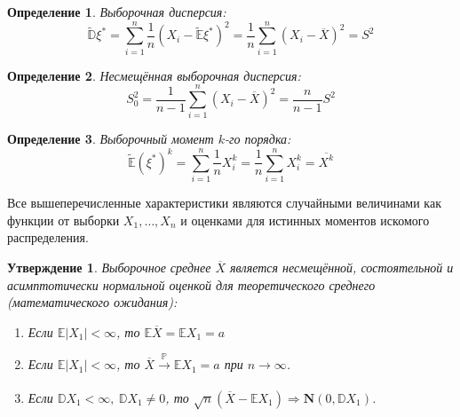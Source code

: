\documentclass[oneside,final,14pt]{extreport}
\theoremstyle{plain}
\newtheorem*{thm*}{Утверждение}
\theoremstyle{definition}
\newtheorem*{defn}{Определение}
\theoremstyle{named}
\begin{document}
\begin{defn}
{\it Выборочная дисперсия:}
\begin{equation*}
    \tilde{\mathbb{D}} \xi^{*}=\sum\limits_{i=1}^{n} \frac{1}{n}(X_{i}-\tilde{\mathbb{E}} \xi^{*})^{2}=\frac{1}{n} \sum\limits_{i=1}^{n}(X_{i}-\overline{X})^{2}=S^{2}
\end{equation*}
\end{defn}

\begin{defn}
{\it Несмещённая выборочная дисперсия:} 
\begin{equation*}
    S_{0}^{2}=\frac{1}{n-1} \sum\limits_{i=1}^{n}\left(X_{i}-\overline{X}\right)^{2} = \frac{n}{n-1} S^2
\end{equation*}
\end{defn}

\begin{defn}
{\it Выборочный момент $k$-го порядка:}
\begin{equation*}
    \tilde{\mathbb{E}}(\xi^{*})^{k}=\sum\limits_{i=1}^{n} \frac{1}{n} X_{i}^{k}=\frac{1}{n} \sum\limits_{i=1}^{n} X_{i}^{k}=\overline{X^{k}}
\end{equation*}
\end{defn}

Все вышеперечисленные характеристики являются случайными величинами как функции от выборки $X_{1}, \ldots, X_{n}$ и оценками для истинных моментов искомого распределения.

\begin{thm*}
Выборочное среднее $\overline{X}$ является несмещённой, состоятельной и асимптотически нормальной оценкой для теоретического среднего (математического ожидания):

\begin{enumerate}[label={\arabic*.}]
    \item Если $\mathbb{E}|X_{1}|<\infty$, то $\mathbb{E}\overline{X}=\mathbb{E} X_{1}=a$
    \item Если $\mathbb{E}|X_{1}|<\infty$, то $\overline{X} \xrightarrow[]{\mathbb{P}} \mathbb{E} X_{1}=a$ при $n \rightarrow \infty$.
    \item Если $\mathbb{D} X_{1}<\infty,~ \mathbb{D} X_{1} \neq 0$, то $\sqrt{n}(\overline{X}-\mathbb{E} X_{1}) \Rightarrow \mathbf{N}(0, \mathbb{D} X_{1})$.
\end{enumerate}
\end{thm*}
\end{document}
